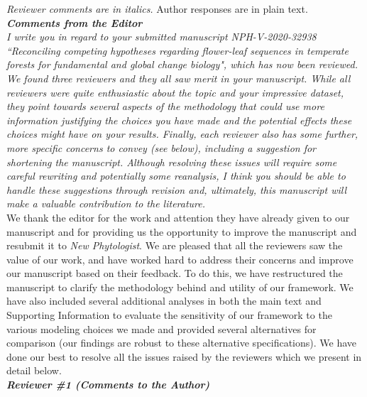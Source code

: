 \documentclass{article}[11pt]
\begin{document}
\setlength\parindent{0pt}



\emph{Reviewer comments are in italics.} Author responses are in plain text.\\

\emph{{\bf Comments from the Editor}}\\

\emph{I write you in regard to your submitted manuscript NPH-V-2020-32938 ``Reconciling competing hypotheses regarding flower-leaf sequences in temperate forests for fundamental and global change biology", which has now been reviewed. We found three reviewers and they all saw merit in your manuscript. While all reviewers were quite enthusiastic about the topic and your impressive dataset, they point towards several aspects of the methodology that could use more information justifying the choices you have made and the potential effects these choices might have on your results. Finally, each reviewer also has some further, more specific concerns to convey (see below), including a suggestion for shortening the manuscript. Although resolving these issues will require some careful rewriting and potentially some reanalysis, I think you should be able to handle these suggestions through revision and, ultimately, this manuscript will make a valuable contribution to the literature.}\\

We thank the editor for the work and attention they have already given to our manuscript and for providing us the opportunity to improve the manuscript and resubmit it to \emph{New Phytologist}. We are pleased that all the reviewers saw the value of our work, and have worked hard to address their concerns and improve our manuscript based on their feedback. To do this, we have restructured the manuscript to clarify the methodology behind and utility of our framework. We have also included several additional analyses in both the main text and Supporting Information to evaluate the sensitivity of our framework to the various modeling choices we made and provided several alternatives for comparison (our findings are robust to these alternative specifications). We have done our best to resolve all the issues raised by the reviewers which we present in detail below.\\

\emph{{\bf Reviewer \#1 (Comments to the Author)}}\\
\end{document}
